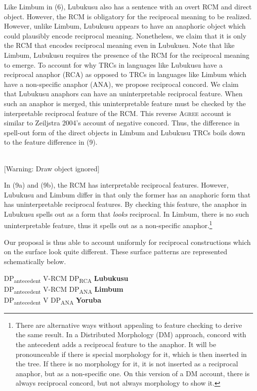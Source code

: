 \documentclass[output=paper]{langsci/langscibook}
\begin{document}
Like Limbum in (6), Lubukusu also has a sentence with an overt RCM and direct object. However, the RCM is obligatory for the reciprocal meaning to be realized. However, unlike Limbum, Lubukusu appears to have an anaphoric object which could plausibly encode reciprocal meaning. Nonetheless, we claim that it is only the RCM that encodes reciprocal meaning even in Lubukusu. Note that like Limbum, Lubukusu requires the presence of the RCM for the reciprocal meaning to emerge. To account for why TRCs in languages like Lubukusu have a reciprocal anaphor (RCA) as opposed to TRCs in languages like Limbum which have a non-specific anaphor (ANA), we propose reciprocal concord. We claim that Lubukusu anaphors can have an uninterpretable reciprocal feature. When such an anaphor is merged, this uninterpretable feature must be checked by the interpretable reciprocal feature of the RCM. This reverse \textsc{Agree} account is similar to Zeiljstra 2004's account of negative concord. Thus, the difference in spell-out form of the direct objects in Limbum and Lubukusu TRCs boils down to the feature difference in (9).


\ea\label{ex:}
\ea
{}\\{}
[Warning: Draw object ignored]
\ex
{}
\z
\z

In (9a) and (9b), the RCM has interpretable reciprocal features. However, Lubukusu and Limbum differ in that only the former has an anaphoric form that has uninterpretable reciprocal features. By checking this feature, the anaphor in Lubukusu spells out as a form that \textit{looks} reciprocal. In Limbum, there is no such uninterpretable feature, thus it spells out as a non-specific anaphor.\footnote{ There are alternative ways without appealing to feature checking to derive the same result. In a Distributed Morphology (DM) approach, concord with the antecedent adds a reciprocal feature to the anaphor. It will be pronounceable if there is special morphology for it, which is then inserted in the tree. If there is no morphology for it, it is not inserted as a reciprocal anaphor, but as a non-specific one. On this version of a DM account, there is always reciprocal concord, but not always morphology to show it.} 

  Our proposal is thus able to account uniformly for reciprocal constructions which on the surface look quite different. These surface patterns are represented schematically below.


\ea\label{ex:}
\glll DP\-\textsubscript{antecedent}      V-RCM  DP\textsubscript{RCA}    \textbf{Lubukusu}\\
DP\-\textsubscript{antecedent}      V-RCM  DP\textsubscript{ANA}    \textbf{Limbum}\\
DP\-\textsubscript{antecedent}      V    DP\textsubscript{ANA}    \textbf{Yoruba}   \\
\z
\end{document}
